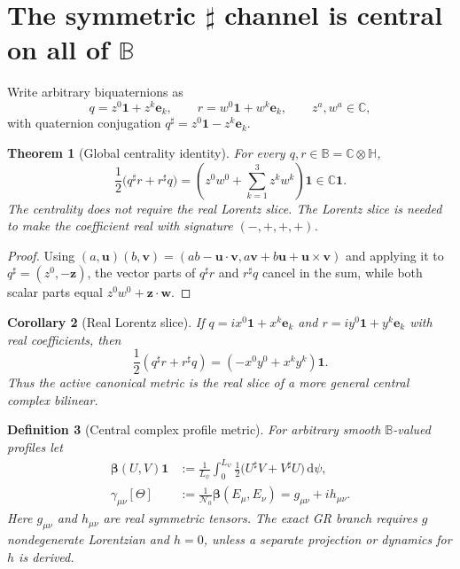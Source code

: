 \documentclass[11pt,a4paper]{article}
\newtheorem{definition}{Definition}[section]
\newtheorem{theorem}[definition]{Theorem}
\newtheorem{corollary}[definition]{Corollary}
\theoremstyle{remark}
\newcommand{\B}{\mathbb B}
\newcommand{\Nzero}{\mathcal N_0}
\newcommand{\one}{\mathbf 1}
\newcommand{\dd}{\mathrm d}
\newcommand{\betaC}{\boldsymbol\beta}
\begin{document}
\section{The symmetric $\sharp$ channel is central on all of $\B$}

Write arbitrary biquaternions as
\[
 q=z^0\one+z^k\mathbf e_k,\qquad
 r=w^0\one+w^k\mathbf e_k,\qquad z^a,w^a\in\mathbb C,
\]
with quaternion conjugation
$q^\sharp=z^0\one-z^k\mathbf e_k$.

\begin{theorem}[Global centrality identity]
For every $q,r\in\B=\mathbb C\otimes\mathbb H$,
\begin{equation}
 \boxed{
 \frac12\bigl(q^\sharp r+r^\sharp q\bigr)
 =\left(z^0w^0+\sum_{k=1}^3z^kw^k\right)\one\in\mathbb C\one.}
 \label{eq:globalcentral}
\end{equation}
The centrality does not require the real Lorentz slice.  The Lorentz slice is
needed to make the coefficient real with signature $(-,+,+,+)$.
\end{theorem}

\begin{proof}
Using
$(a,\mathbf u)(b,\mathbf v)=(ab-\mathbf u\!\cdot\!\mathbf v,
 a\mathbf v+b\mathbf u+\mathbf u\!\times\!\mathbf v)$ and applying it to
$q^\sharp=(z^0,-\mathbf z)$, the vector parts of $q^\sharp r$ and
$r^\sharp q$ cancel in the sum, while both scalar parts equal
$z^0w^0+\mathbf z\cdot\mathbf w$.
\end{proof}

\begin{corollary}[Real Lorentz slice]
If
$q=ix^0\one+x^k\mathbf e_k$ and
$r=iy^0\one+y^k\mathbf e_k$ with real coefficients, then
\[
 \frac12(q^\sharp r+r^\sharp q)
 =(-x^0y^0+x^ky^k)\one.
\]
Thus the active canonical metric is the real slice of a more general central
complex bilinear.
\end{corollary}

\begin{definition}[Central complex profile metric]
For arbitrary smooth $\B$-valued profiles let
\begin{align}
 \betaC(U,V)\one
 &:=\frac1{L_\psi}\int_0^{L_\psi}
 \frac12\bigl(U^\sharp V+V^\sharp U\bigr)\,\dd\psi,\\
 \gamma_{\mu\nu}[\Theta]
 &:=\frac1{\Nzero}\betaC(E_\mu,E_\nu)
 =g_{\mu\nu}+ih_{\mu\nu}.
 \label{eq:complexmetric}
\end{align}
Here $g_{\mu\nu}$ and $h_{\mu\nu}$ are real symmetric tensors.  The exact GR
branch requires $g$ nondegenerate Lorentzian and $h=0$, unless a separate
projection or dynamics for $h$ is derived.
\end{definition}
\end{document}
